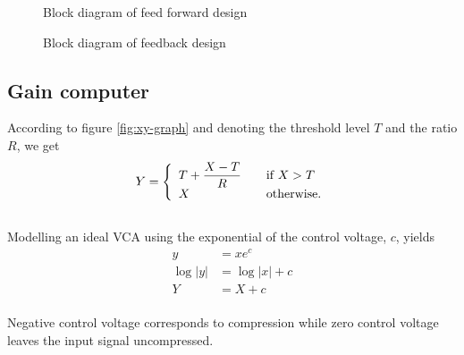 \documentclass[]{article}
\begin{document}
\begin{figure}[ht]
\centering

\caption{Block diagram of feed forward design} 
\label{fig:feedforward-blockdiagram}
\end{figure}

\begin{figure}[ht]
\centering

\caption{Block diagram of feedback design} 
\label{fig:feedback-blockdiagram}
\end{figure}

\subsection{Gain computer}
According to figure \ref{fig:xy-graph} and denoting the threshold level $T$ and the ratio $R$, we get
\begin{equation} \label{eq:gaincomp}
Y = \left\{ 
  \begin{array}{l l}
    T+ \dfrac{X-T}{R} & \quad \text{if $X > T$}\\
    X & \quad \text{otherwise.}
  \end{array} \right.
\end{equation}
\\Modelling an ideal VCA using the exponential of the control voltage, $c$, yields
\begin{align}
y &= xe^{c}   \\
\log|y| & = \log|x| + c   \\
Y &= X + c \label{eq:cv}
\end{align}
\\Negative control voltage corresponds to compression while zero control voltage leaves the input signal uncompressed. 
\end{document}
